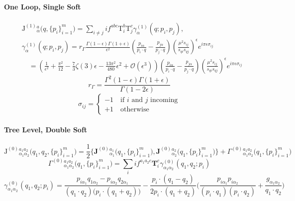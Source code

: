 \documentclass[a4paper,11pt]{article}
\begin{document}
\paragraph{One Loop, Single Soft}
\begin{align}
&\bm{\mathrm{J}}^{(1)}{}^{a}_{\alpha}\big( q,\{ p_i \}_{i=1}^m \big) =  \sum_{i \neq j} i f^{abc} \bm{\mathrm{T}}_i^b \bm{\mathrm{T}}_j^c \gamma^{(1)}_{\alpha}(q; p_i, p_j), \\
&\gamma^{(1)}_{\alpha}(q; p_i, p_j) = r_\Gamma \frac{\Gamma(1 - \epsilon) \Gamma(1 + \epsilon)}{\epsilon^2} \left(\frac{p_{i\alpha}}{p_i \cdot q} - \frac{p_{j \alpha}}{p_j \cdot q} \right) \left(\frac{\mu^2 s_{ij}}{s_{qi} s_{qj}} \right)^\epsilon e^{i \pi \epsilon \sigma_{ij}} \\
& \quad = \left(\frac{1}{\epsilon^2} + \frac{\pi^2}{12} - \frac{7}{3} \zeta(3) \epsilon - \frac{13 \pi^2}{480} \epsilon^2 + \mathcal{O}(\epsilon^3) \right) \left(\frac{p_{i\alpha}}{p_i \cdot q} - \frac{p_{j \alpha}}{p_j \cdot q} \right) \left(\frac{\mu^2 s_{ij}}{s_{qi} s_{qj}} \right)^\epsilon e^{i \pi \epsilon \sigma_{ij}}
\end{align}
%
\begin{equation}
r_\Gamma = \frac{\Gamma^2 (1 - \epsilon) \Gamma (1 + \epsilon)}{\Gamma(1 - 2 \epsilon)}
\end{equation}
%
\begin{equation}
\sigma_{ij} = \begin{cases} -1 \quad \text{if } i \text{ and } j \text{ incoming} \\
+1 \quad \text{otherwise}
\end{cases}
\end{equation}
%
\paragraph{Tree Level, Double Soft}
\begin{equation}
\bm{\mathrm{J}}^{(0)}{}^{a_1 a_2}_{\alpha_1 \alpha_2}\big( q_1, q_2,\{ p_i \}_{i=1}^m \big) = \frac{1}{2} \Big \lbrace \mathbf{J}^{(0)}{}^{a_1}_{\alpha_1} \big( q_1, \{p_i \}_{i = 1}^m \big), \mathbf{J}^{(0)}{}^{a_2}_{\alpha_2}  \big( q_1, \{p_i \}_{i = 1}^m \big) \Big \rbrace + \Gamma^{(0)}{}^{a_1 a_2}_{\alpha_1 \alpha_2} \big( q_1, \{p_i \}_{i = 1}^m \big)
\end{equation}
%
\begin{equation}
\Gamma^{(0)}{}^{a_1 a_2}_{\alpha_1 \alpha_2} \big( q_1, \{p_i \}_{i = 1}^m \big) = \sum_i i f^{a_1 a_2 c} \mathbf{T}_i^c \gamma^{(0)}_{\alpha_1 \alpha_2}(q_1, q_2; p_i)
\end{equation}
%
\begin{equation}
\gamma^{(0)}_{\alpha_1 \alpha_2}(q_1, q_2; p_i) = \frac{p_{i\alpha_1} q_{1\alpha_2} - p_{i \alpha_2} q_{2 \alpha_1}}{(q_1 \cdot q_2) \big( p_i \cdot (q_1 + q_2)\big)} - \frac{p_i \cdot (q_1 - q_2)}{2 p_i \cdot ( q_1 + q_2 )} \bigg( \frac{p_{i \alpha_1} p_{i \alpha_2}}{(p_i \cdot q_1) (p_i \cdot q_2)} + \frac{g_{\alpha_1\alpha_2}}{q_1 \cdot q_2} \bigg)
\end{equation}
%
\end{document}
